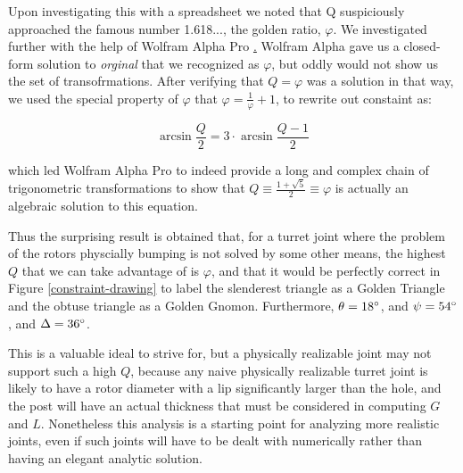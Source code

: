 \documentclass[12pt]{article}
\begin{document}
Upon investigating this with a spreadsheet we noted that Q suspiciously approached the famous number 1.618..., the golden ratio, $\varphi$.
We investigated further with the help of Wolfram Alpha Pro \href{https://www.wolframalpha.com}.
Wolfram Alpha gave us a closed-form solution to \emph{orginal} that we recognized as $\varphi$, but oddly would
not show us the set of transofrmations. After verifying that $Q = \varphi$ was
a solution in that way, we used the special property of
$\varphi$ that $ \varphi = \frac{1}{\varphi} + 1 $, to rewrite out constaint as:

\[\tag{assuming $Q=\varphi$} \arcsin{\frac{Q}{2}} = 3 \cdot \arcsin{\frac{Q - 1}{2}} \]

which led Wolfram Alpha Pro to indeed provide a long and complex chain of trigonometric transformations to show that
$Q \equiv \frac{1 + \sqrt{5}}{2} \equiv \varphi$ is actually an algebraic solution to
this equation.

Thus the surprising result is obtained that, for a turret joint where the problem of the rotors physcially bumping is not
solved by some other means, the highest $Q$ that we can take advantage of is $\varphi$, and that it would be
perfectly correct in Figure \ref{constraint-drawing} to label the slenderest triangle as a Golden Triangle and the obtuse
triangle as a Golden Gnomon. Furthermore, $\theta = 18\degree$, and $\psi = 54\degree$, and $\Delta = 36\degree$.

This is a valuable ideal to strive for, but a physically realizable joint may not support such a high $Q$,
because any naive physically realizable
turret joint is likely to have a rotor diameter with a lip significantly larger than the hole, and the post will have an actual
thickness that must be considered in computing $G$ and $L$. Nonetheless this analysis is a starting point for analyzing more
realistic joints, even if such joints will have to be dealt with numerically rather than having an elegant analytic solution.
\end{document}

